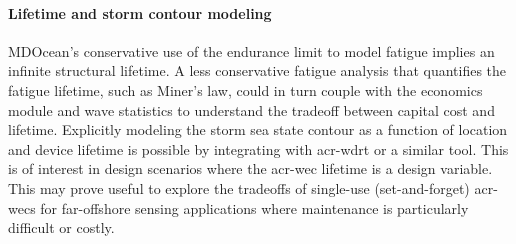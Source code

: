 \documentclass[a4paper,fleqn,colorlinks,unicode,lineno]{cas-dc} %
\begin{document}
    \paragraph{Lifetime and storm contour modeling}
    MDOcean's conservative use of the endurance limit to model fatigue implies an infinite structural lifetime.
    A less conservative fatigue analysis that quantifies the fatigue lifetime, such as Miner's law, could in turn couple with the economics module and wave statistics to understand the tradeoff between capital cost and lifetime.
    Explicitly modeling the storm sea state contour as a function of location and device lifetime is possible by integrating with \gls{acr-wdrt} or a similar tool.
    This is of interest in design scenarios where the \gls{acr-wec} lifetime is a design variable.
    This may prove useful to explore the tradeoffs of single-use (set-and-forget) \glspl{acr-wec} for far-offshore sensing applications where maintenance is particularly difficult or costly.
\end{document}
